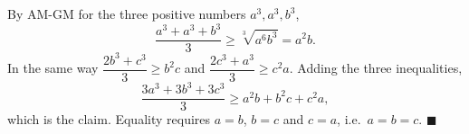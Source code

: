 By AM-GM for the three positive numbers $a^3,a^3,b^3$,
\[
\dfrac{a^3+a^3+b^3}{3}\ge\sqrt[3]{a^6b^3}=a^2b .
\]
In the same way $\dfrac{2b^3+c^3}{3}\ge b^2c$ and $\dfrac{2c^3+a^3}{3}\ge c^2a$. Adding the three inequalities,
\[
\dfrac{3a^3+3b^3+3c^3}{3}\ge a^2b+b^2c+c^2a,
\]
which is the claim. Equality requires $a=b$, $b=c$ and $c=a$, i.e.\ $a=b=c$. $\blacksquare$
